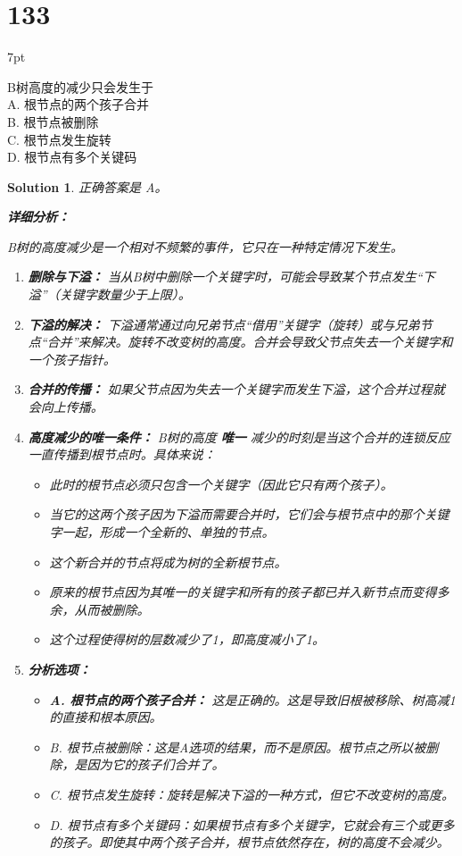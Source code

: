 \documentclass[UTF8]{report}
\newtheorem{solution}{Solution}
\theoremstyle{MyLineTheoremStyle} %
\theoremstyle{MyBlockTheoremStyle} %
\theoremstyle{MySubsubsectionStyle} %
\newenvironment{graybox}{%
        \def\FrameCommand{%
        \hspace{1pt}%
        {\color{gray}\small \vrule width 2pt}%
        {\color{graybox_color}\vrule width 4pt}%
        \colorbox{graybox_color}%
        }%
        \MakeFramed{\advance\hsize-\width\FrameRestore}%
        \noindent\hspace{-4.55pt}%
        \begin{adjustwidth}{}{7pt}%
        \vspace{2pt}\vspace{2pt}%
        }
        {%
        \vspace{2pt}\end{adjustwidth}\endMakeFramed%
        }
\begin{document}
\section*{133}
\begin{graybox}
B树高度的减少只会发生于\\
A. 根节点的两个孩子合并\\
B. 根节点被删除\\
C. 根节点发生旋转\\
D. 根节点有多个关键码
\end{graybox}

\begin{solution}
正确答案是 A。

\textbf{详细分析：}

B树的高度减少是一个相对不频繁的事件，它只在一种特定情况下发生。

\begin{enumerate}
    \item \textbf{删除与下溢：} 当从B树中删除一个关键字时，可能会导致某个节点发生“下溢”（关键字数量少于上限）。

    \item \textbf{下溢的解决：} 下溢通常通过向兄弟节点“借用”关键字（旋转）或与兄弟节点“合并”来解决。旋转不改变树的高度。合并会导致父节点失去一个关键字和一个孩子指针。

    \item \textbf{合并的传播：} 如果父节点因为失去一个关键字而发生下溢，这个合并过程就会向上传播。

    \item \textbf{高度减少的唯一条件：} B树的高度 \textbf{唯一} 减少的时刻是当这个合并的连锁反应一直传播到根节点时。具体来说：
    \begin{itemize}
        \item 此时的根节点必须只包含一个关键字（因此它只有两个孩子）。
        \item 当它的这两个孩子因为下溢而需要合并时，它们会与根节点中的那个关键字一起，形成一个全新的、单独的节点。
        \item 这个新合并的节点将成为树的全新根节点。
        \item 原来的根节点因为其唯一的关键字和所有的孩子都已并入新节点而变得多余，从而被删除。
        \item 这个过程使得树的层数减少了1，即高度减小了1。
    \end{itemize}

    \item \textbf{分析选项：}
    \begin{itemize}
        \item \textbf{A. 根节点的两个孩子合并：} 这是正确的。这是导致旧根被移除、树高减1的直接和根本原因。
        \item B. 根节点被删除：这是A选项的结果，而不是原因。根节点之所以被删除，是因为它的孩子们合并了。
        \item C. 根节点发生旋转：旋转是解决下溢的一种方式，但它不改变树的高度。
        \item D. 根节点有多个关键码：如果根节点有多个关键字，它就会有三个或更多的孩子。即使其中两个孩子合并，根节点依然存在，树的高度不会减少。
    \end{itemize}
\end{enumerate}


\end{solution}
\end{document}
